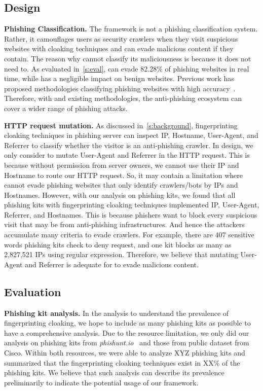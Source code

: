 \subsection{\spartacus Design}

\noindent
\textbf{Phishing Classification.}
The \spartacus framework is not a phishing classification system.
Rather, it camouflages users as security crawlers when they visit suspicious websites with cloaking techniques and can evade malicious content if they contain.
The reason why \spartacus cannot classify its maliciousness is because it does not need to.
As evaluated in~\autoref{s:eval}, \spartacus can evade 82.28\% of phishing websites in real time, while has a negligible impact on benign websites.
Previous work has proposed methodologies classifying phishing websites with high accuracy~\cite{whittaker2010large, lin2021phishpedia}.
Therefore, with \spartacus and existing methodologies, the anti-phishing ecosystem can cover a wider range of phishing attacks.


\noindent
\textbf{HTTP request mutation.}
As discussed in~\autoref{s:background}, fingerprinting cloaking techniques in phishing server can inspect IP, Hostname, User-Agent, and Referrer to classify whether the visitor is an anti-phishing crawler.
In \spartacus design, we only consider to mutate User-Agent and Referrer in the HTTP request.
This is because without permission from server owners, we cannot use their IP and Hostname to route our HTTP request.
So, it may contain a limitation where \spartacus cannot evade phishing websites that only identify crawlers/bots by IPs and Hostnames.
However, with our analysis on phishing kits, we found that all phishing kits with fingerprinting cloaking techniques implemented IP, User-Agent, Referrer, and Hostnames.
This is because phishers want to block every suspicious visit that may be from anti-phishing infrastructures.
And hence the attackers accumulate many criteria to evade crawlers.
For example, there are 407 sensitive words phishing kits check to deny request, and one kit blocks as many as 2,827,521 IPs using regular expression.
Therefore, we believe that mutating User-Agent and Referrer is adequate for \spartacus to evade malicious content.

\subsection{\spartacus Evaluation}

\noindent
\textbf{Phishing kit analysis.}
In the analysis to understand the prevalence of fingerprinting cloaking, we hope to include as many phishing kits as possible to have a comprehensive analysis.
Due to the resource limitation, we only did our analysis on phishing kits from \emph{phishunt.io}~\cite{phishunt} and those from public dataset from Cisco.
Within both resources, we were able to analyze XYZ phishing kits and summarized that the fingerprinting cloaking techniques exist in XX\% of the phishing kits.
We believe that such analysis can describe its prevalence preliminarily to indicate the potential usage of our \spartacus framework.


